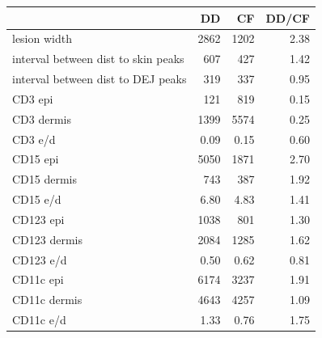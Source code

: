 \documentclass{article}
\begin{document}
\begin{tabular}{lrrr}
   \hline  &DD& CF& DD/CF\\ 
\hline
lesion width & 2862 & 1202 & 2.38 \\ 
  interval between dist to skin peaks & 607 & 427 & 1.42 \\ 
  interval between dist to DEJ peaks & 319 & 337 & 0.95 \\ 
   \hline
CD3 epi & 121 & 819 & 0.15 \\ 
  CD3 dermis & 1399 & 5574 & 0.25 \\ 
  CD3 e/d & 0.09 & 0.15 & 0.60 \\ 
   \hline
CD15 epi & 5050 & 1871 & 2.70 \\ 
  CD15 dermis & 743 & 387 & 1.92 \\ 
  CD15 e/d & 6.80 & 4.83 & 1.41 \\ 
   \hline
CD123 epi & 1038 & 801 & 1.30 \\ 
  CD123 dermis & 2084 & 1285 & 1.62 \\ 
  CD123 e/d & 0.50 & 0.62 & 0.81 \\ 
   \hline
CD11c epi & 6174 & 3237 & 1.91 \\ 
  CD11c dermis & 4643 & 4257 & 1.09 \\ 
  CD11c e/d & 1.33 & 0.76 & 1.75 \\ 
   \hline
\end{tabular}
\end{document}
